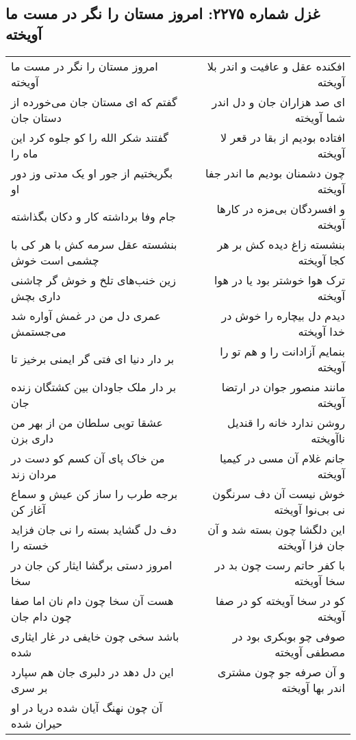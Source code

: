 \begin{center}
\section*{غزل شماره ۲۲۷۵: امروز مستان را نگر در مست ما آویخته}
\label{sec:2275}
\begin{longtable}{l p{0.5cm} r}
امروز مستان را نگر در مست ما آویخته
&&
افکنده عقل و عافیت و اندر بلا آویخته
\\
گفتم که ای مستان جان می‌خورده از دستان جان
&&
ای صد هزاران جان و دل اندر شما آویخته
\\
گفتند شکر الله را کو جلوه کرد این ماه را
&&
افتاده بودیم از بقا در قعر لا آویخته
\\
بگریختیم از جور او یک مدتی وز دور او
&&
چون دشمنان بودیم ما اندر جفا آویخته
\\
جام وفا برداشته کار و دکان بگذاشته
&&
و افسردگان بی‌مزه در کارها آویخته
\\
بنشسته عقل سرمه کش با هر کی با چشمی است خوش
&&
بنشسته زاغ دیده کش بر هر کجا آویخته
\\
زین خنب‌های تلخ و خوش گر چاشنی داری بچش
&&
ترک هوا خوشتر بود یا در هوا آویخته
\\
عمری دل من در غمش آواره شد می‌جستمش
&&
دیدم دل بیچاره را خوش در خدا آویخته
\\
بر دار دنیا ای فتی گر ایمنی برخیز تا
&&
بنمایم آزادانت را و هم تو را آویخته
\\
بر دار ملک جاودان بین کشتگان زنده جان
&&
مانند منصور جوان در ارتضا آویخته
\\
عشقا تویی سلطان من از بهر من داری بزن
&&
روشن ندارد خانه را قندیل ناآویخته
\\
من خاک پای آن کسم کو دست در مردان زند
&&
جانم غلام آن مسی در کیمیا آویخته
\\
برجه طرب را ساز کن عیش و سماع آغاز کن
&&
خوش نیست آن دف سرنگون نی بی‌نوا آویخته
\\
دف دل گشاید بسته را نی جان فزاید خسته را
&&
این دلگشا چون بسته شد و آن جان فزا آویخته
\\
امروز دستی برگشا ایثار کن جان در سخا
&&
با کفر حاتم رست چون بد در سخا آویخته
\\
هست آن سخا چون دام نان اما صفا چون دام جان
&&
کو در سخا آویخته کو در صفا آویخته
\\
باشد سخی چون خایفی در غار ایثاری شده
&&
صوفی چو بوبکری بود در مصطفی آویخته
\\
این دل دهد در دلبری جان هم سپارد بر سری
&&
و آن صرفه جو چون مشتری اندر بها آویخته
\\
آن چون نهنگ آیان شده دریا در او حیران شده

\end{longtable}
\end{center}

